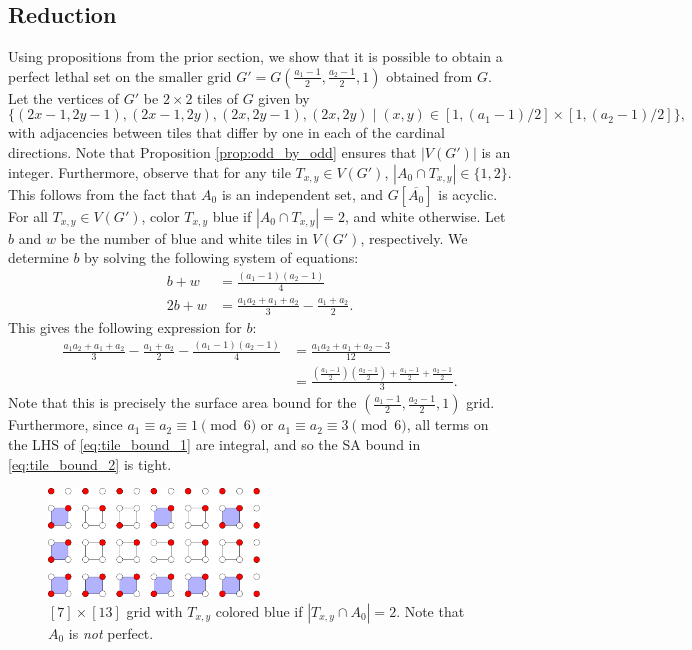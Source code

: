 \subsection{Reduction}
Using propositions from the prior section, we show that it is possible to obtain a perfect lethal set on the smaller grid $G' = G(\frac{a_1-1}{2}, \frac{a_2-1}{2}, 1)$ obtained from $G$. Let the vertices of $G'$ be $2 \times 2$ tiles of $G$ given by
$$\{(2x-1,2y-1),(2x-1,2y),(2x,2y-1),(2x,2y) \mid (x,y) \in [1, (a_1-1)/2] \times [1, (a_2-1)/2]\},$$
with adjacencies between tiles that differ by one in each of the cardinal directions. Note that Proposition \ref{prop:odd_by_odd} ensures that $|V(G')|$ is an integer. Furthermore, observe that for any tile $T_{x,y} \in V(G')$, $|A_0 \cap T_{x,y}| \in \{1,2\}$. This follows from the fact that $A_0$ is an independent set, and $G[\overline{A_0}]$ is acyclic. For all $T_{x,y} \in V(G')$, color $T_{x,y}$ blue if $|A_0 \cap T_{x,y}| = 2$, and white otherwise. Let $b$ and $w$ be the number of blue and white tiles in $V(G')$, respectively. We determine $b$ by solving the following system of equations:
\begin{align*}
b + w &= \frac{(a_1-1)(a_2-1)}{4} \\
2b + w &= \frac{a_1a_2+a_1+a_2}{3} - \frac{a_1+a_2}{2}.
\end{align*}
This gives the following expression for $b$:
\begin{align}
\frac{a_1a_2+a_1+a_2}{3} - \frac{a_1+a_2}{2} - \frac{(a_1-1)(a_2-1)}{4} &= \frac{a_1a_2+a_1+a_2-3}{12} \label{eq:tile_bound_1} \\
&= \frac{(\frac{a_1-1}{2})(\frac{a_2-1}{2}) + \frac{a_1-1}{2} + \frac{a_2-1}{2}}{3} \label{eq:tile_bound_2}.
\end{align}
Note that this is precisely the surface area bound for the $(\frac{a_1-1}{2}, \frac{a_2-1}{2}, 1)$ grid. Furthermore, since $a_1 \equiv a_2 \equiv 1 \pmod 6$ or $a_1 \equiv a_2 \equiv 3 \pmod 6$, all terms on the LHS of \ref{eq:tile_bound_1} are integral, and so the SA bound in \ref{eq:tile_bound_2} is tight.

\begin{figure}[]
\centering
\includegraphics[width=0.5\textwidth]{figures/6/tiles.pdf}
\caption{$[7] \times [13]$ grid with $T_{x,y}$ colored blue if $|T_{x,y} \cap A_0| = 2$. Note that $A_0$ is \emph{not} perfect.}
\label{fig:tiles}
\end{figure} 

